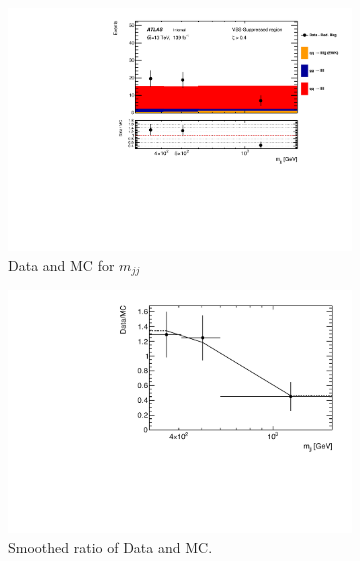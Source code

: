 \begin{figure}[htb]
    \centering
    \begin{subfigure}{.48\textwidth}
        \centering
        \includegraphics[width=.9\linewidth]{figures/Analysis/Unfolding/DDClosure_VBS_Suppressed_Ratio.pdf}
        \caption{ Data and MC for $m_{jj}$ \label{fig:ddclosure_DataMC}}
    \end{subfigure}
    \begin{subfigure}{.48\textwidth}
        \centering
        \includegraphics[width=.9\linewidth]{figures/Analysis/Unfolding/DDClosure_VBS_Suppressed_SmoothRatio.pdf}
        \caption{Smoothed ratio of Data and MC. \label{fig:ddclosure_DataMCSmooth} }
    \end{subfigure}\\
    \begin{subfigure}{.48\textwidth}
        \centering

\end{subfigure}
\end{figure}
